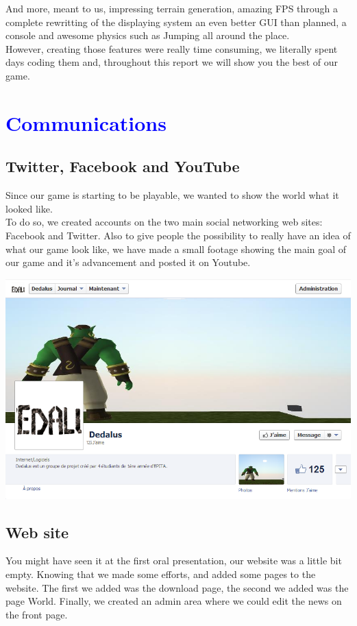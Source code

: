 \documentclass[article]{report}             %
\begin{document}
 			And more, meant to us, impressing terrain generation, amazing FPS through a complete rewritting of the displaying system an even better GUI than planned, a console and awesome physics such as Jumping all around the place. \\

 			However, creating those features were really time consuming, we literally spent days coding them and, throughout this report we will show you the best of our game.
  		\chapter{\textcolor{blue}{Communications}}
			\section{Twitter, Facebook and YouTube }
				Since our game is starting to be playable, we wanted to show the world what it looked like.\\
				To do so, we created accounts on the two main social networking web sites: Facebook and Twitter. Also to give people the possibility to really have an idea of what our game look like, we have made a small footage showing the main goal of our game and it's advancement and posted it on Youtube.

				\includegraphics[width = 17cm]{images/Graphics/fb.png}
				\newpage

			\section{Web site}
				You might have seen it at the first oral presentation, our website was a little bit empty. Knowing that we made some efforts, and added some pages to the website. The first we added was the download page, the second we added was the page World. Finally, we created an admin area where we could edit the news on the front page.
\end{document}

